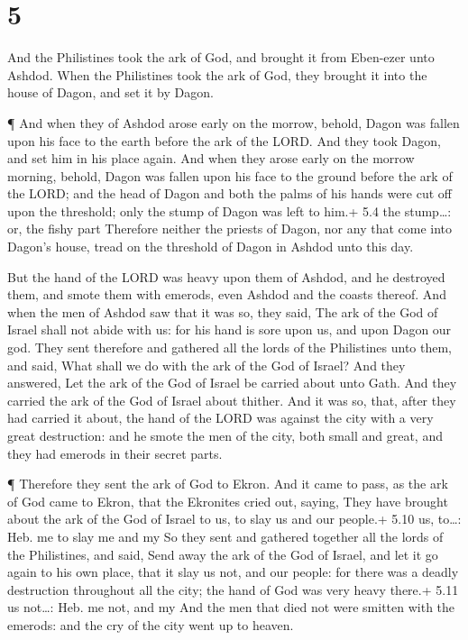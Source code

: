 \hypertarget{section-4}{%
\section{5}\label{section-4}}

 And the Philistines took the ark of God, and brought it
from Eben-ezer unto Ashdod.  When the Philistines took the
ark of God, they brought it into the house of Dagon, and set it by
Dagon.

 ¶ And when they of Ashdod arose early on the morrow,
behold, Dagon was fallen upon his face to the earth before the ark of
the LORD. And they took Dagon, and set him in his place again.
 And when they arose early on the morrow morning, behold,
Dagon was fallen upon his face to the ground before the ark of the LORD;
and the head of Dagon and both the palms of his hands were cut off upon
the threshold; only the stump of Dagon was left to him.+ 5.4 the
stump\ldots: or, the fishy part  Therefore neither the
priests of Dagon, nor any that come into Dagon's house, tread on the
threshold of Dagon in Ashdod unto this day.

 But the hand of the LORD was heavy upon them of Ashdod, and
he destroyed them, and smote them with emerods, even Ashdod and the
coasts thereof.  And when the men of Ashdod saw that it was
so, they said, The ark of the God of Israel shall not abide with us: for
his hand is sore upon us, and upon Dagon our god.  They sent
therefore and gathered all the lords of the Philistines unto them, and
said, What shall we do with the ark of the God of Israel? And they
answered, Let the ark of the God of Israel be carried about unto Gath.
And they carried the ark of the God of Israel about thither.
 And it was so, that, after they had carried it about, the
hand of the LORD was against the city with a very great destruction: and
he smote the men of the city, both small and great, and they had emerods
in their secret parts.

 ¶ Therefore they sent the ark of God to Ekron. And it came
to pass, as the ark of God came to Ekron, that the Ekronites cried out,
saying, They have brought about the ark of the God of Israel to us, to
slay us and our people.+ 5.10 us, to\ldots: Heb. me to slay me and my
 So they sent and gathered together all the lords of the
Philistines, and said, Send away the ark of the God of Israel, and let
it go again to his own place, that it slay us not, and our people: for
there was a deadly destruction throughout all the city; the hand of God
was very heavy there.+ 5.11 us not\ldots: Heb. me not, and my
 And the men that died not were smitten with the emerods:
and the cry of the city went up to heaven.

